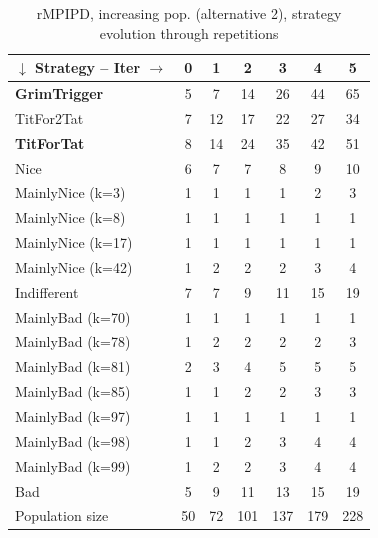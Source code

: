 \documentclass[journal,10pt,twoside]{IEEEtran}
\begin{document}
\begin{table}[ht]
    \caption{rMPIPD, increasing pop. (alternative 2), strategy evolution through repetitions}
    \label{tab:ripdmp-incrA2}
    \centering
    \begin{tabular}{l|cccccc} \toprule
        $\downarrow$ Strategy -- Iter $\rightarrow$ & 0 & 1 & 2 & 3 & 4 & 5 \\ \midrule
        \textbf{GrimTrigger} &   5 &   7 &   14 &   26 &   44 &   65 \\
        TitFor2Tat           &   7 &  12 &   17 &   22 &   27 &   34 \\
        \textbf{TitForTat}   &   8 &  14 &   24 &   35 &   42 &   51 \\
        Nice                 &   6 &   7 &    7 &    8 &    9 &   10 \\
        MainlyNice (k=3)     &   1 &   1 &    1 &    1 &    2 &    3 \\
        MainlyNice (k=8)     &   1 &   1 &    1 &    1 &    1 &    1 \\
        MainlyNice (k=17)    &   1 &   1 &    1 &    1 &    1 &    1 \\
        MainlyNice (k=42)    &   1 &   2 &    2 &    2 &    3 &    4 \\
        Indifferent          &   7 &   7 &    9 &   11 &   15 &   19 \\
        MainlyBad (k=70)     &   1 &   1 &    1 &    1 &    1 &    1 \\
        MainlyBad (k=78)     &   1 &   2 &    2 &    2 &    2 &    3 \\
        MainlyBad (k=81)     &   2 &   3 &    4 &    5 &    5 &    5 \\
        MainlyBad (k=85)     &   1 &   1 &    2 &    2 &    3 &    3 \\
        MainlyBad (k=97)     &   1 &   1 &    1 &    1 &    1 &    1 \\
        MainlyBad (k=98)     &   1 &   1 &    2 &    3 &    4 &    4 \\
        MainlyBad (k=99)     &   1 &   2 &    2 &    3 &    4 &    4 \\
        Bad                  &   5 &   9 &   11 &   13 &   15 &   19 \\ \midrule
        Population size      &  50 &  72 &  101 &  137 &  179 &  228 \\ \bottomrule
    \end{tabular}
\end{table}
\end{document}
